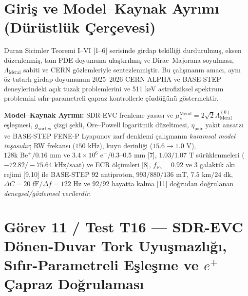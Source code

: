 \documentclass[12pt,a4paper]{article}
\begin{document}
\section[Giriş ve Model--Kaynak Ayrımı]{Giriş ve Model--Kaynak Ayrımı \\ (Dürüstlük Çerçevesi)}

Duran Sicimler Teoremi I--VI [1--6] serisinde girdap tekilliği durdurulmuş, eksen düzenlenmiş, tam PDE doyumuna ulaştırılmış ve Dirac--Majorana soyulması, $\Lambda_{\mathrm{Meral}}$ sabiti ve CERN gözlemleriyle sentezlenmiştir. Bu çalışmanın amacı, aynı öz-tutarlı girdap doyumunun 2025--2026 CERN ALPHA ve BASE-STEP deneylerindeki açık tuzak problemlerini ve 511 keV astrofiziksel spektrum problemini sıfır-parametreli çapraz kontrollerle çözdüğünü göstermektir.

\textbf{Model--Kaynak Ayrımı:} SDR-EVC frenleme yasası ve $\mu_s^{\mathrm{Meral}}=2\sqrt{2}\Lambda_{\mathrm{Meral}}^{(0)}$ eşleşmesi, $g_{\mathrm{vortex}}$ çizgi şekli, Ore--Powell logaritmik düzeltmesi, $\eta_{\mathrm{pair}}$ yakıt ansatzı ve BASE-STEP FENE-P Lyapunov zarf denklemi çalışmanın \textit{kuramsal model inşasıdır}; RW frekansı ($150\text{ kHz}$), kuyu derinliği ($15.6\to1.0\text{ V}$), $128\text{k Be}^+ / 0.16\text{ mm}$ ve $3.4\times10^6\text{ e}^+ / 0.3\text{--}0.5\text{ mm}$ [7], $1.03/1.07\text{ T}$ sürüklenmeleri ($-72.82/-75.64\text{ kHz/saat}$) ve ECR ölçümleri [8], $f_{\mathrm{Ps}}=0.92$ ve 3 galaktik akı rejimi [9,10] ile BASE-STEP $92$ antiproton, $993/880/136\text{ mT}$, $7.5\text{ km}/24\text{ dk}$, $\Delta C=20\text{ fF}/\Delta f=122\text{ Hz}$ ve $92/92$ hayatta kalma [11] doğrudan doğrulanan \textit{deneysel/gözlemsel verilerdir}.

\section{Görev 11 / Test T16 --- SDR-EVC Dönen-Duvar Tork Uyuşmazlığı, Sıfır-Parametreli Eşleşme ve $e^+$ Çapraz Doğrulaması}
\end{document}
